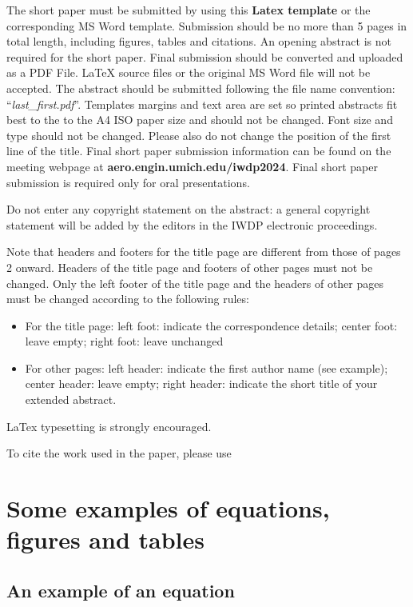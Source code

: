 \documentclass[11pt,letterpaper]{article}
\begin{document}
The short paper must be submitted by using this \textbf{Latex template} or the corresponding MS Word template. Submission should be no more than 5 pages in total length, including figures, tables and citations. An opening abstract is not required for the short paper. Final submission should be converted and uploaded as a PDF File. LaTeX source files or the original MS Word file will not be accepted.  The abstract should be submitted following the file name convention: ``\emph{last\_first.pdf}''. Templates margins and text area are set so printed abstracts fit best to the to the A4 ISO paper size and should not be changed. Font size and type should not be changed. Please also do not change the position of the first line of the title. Final short paper submission information can be found on the meeting webpage at \textbf{aero.engin.umich.edu/iwdp2024}. Final short paper submission is required only for oral presentations. 


Do not enter any copyright statement on the abstract: a general copyright statement will be added by the editors in the IWDP electronic proceedings.


%
Note that headers and footers for the title page are different from those of pages 2 onward. Headers of the title page and footers of other pages must not be changed.
Only the left footer of the title page and the headers of other pages must be changed according to the following rules:
\begin{itemize}
    \item For the title page: left foot: indicate the correspondence details; center foot: leave empty; right foot: leave unchanged
    \item  For other pages: left header: indicate the first author name (see example); center header: leave empty; right header: indicate the short title of your extended abstract.
\end{itemize}
LaTex typesetting is strongly encouraged.

To cite the work used in the paper, please use \cite{Bykovskii2006, kailasanath2000review, Lu2014review}


\section{Some examples of equations, figures and tables}

\subsection{An example of an equation}
\end{document}
